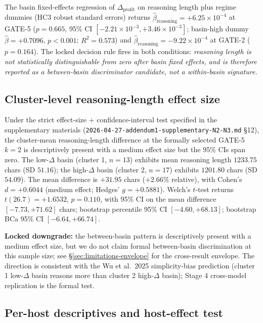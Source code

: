 The basin fixed-effects regression of $\Delta_{\text{profit}}$ on reasoning length plus regime dummies (HC3 robust standard errors) returns $\hat{\beta}_{\text{reasoning}} = +6.25 \times 10^{-4}$ at GATE-5 ($p = 0.665$, 95\% CI $[-2.21 \times 10^{-3}, +3.46 \times 10^{-3}]$; basin-high dummy $\hat{\beta} = +0.7096$, $p < 0.001$; $R^2 = 0.573$) and $\hat{\beta}_{\text{reasoning}} = -9.22 \times 10^{-4}$ at GATE-2 ($p = 0.164$). The locked decision rule fires in both conditions: \emph{reasoning length is not statistically distinguishable from zero after basin fixed effects, and is therefore reported as a between-basin discriminator candidate, not a within-basin signature.}

\subsection{Cluster-level reasoning-length effect size}
\label{sec:results-cluster-effect}

Under the strict effect-size + confidence-interval test specified in the supplementary materials (\texttt{2026-04-27-addendum1-supplementary-N2-N3.md} \S 12), the cluster-mean reasoning-length difference at the formally selected GATE-5 $k = 2$ is descriptively present with a medium effect size but the 95\% CIs span zero. The low-$\Delta$ basin (cluster 1, $n = 13$) exhibits mean reasoning length $1233.75$ chars (SD $51.16$); the high-$\Delta$ basin (cluster 2, $n = 17$) exhibits $1201.80$ chars (SD $54.09$). The mean difference is $+31.95$ chars ($+2.66\%$ relative), with Cohen's $d = +0.6044$ (medium effect; Hedges' $g = +0.5881$). Welch's $t$-test returns $t(26.7) = +1.6532$, $p = 0.110$, with 95\% CI on the mean difference $[-7.73, +71.62]$ chars; bootstrap percentile 95\% CI $[-4.60, +68.13]$; bootstrap BCa 95\% CI $[-6.64, +66.74]$.

\textbf{Locked downgrade:} the between-basin pattern is descriptively present with a medium effect size, but we do not claim formal between-basin discrimination at this sample size; see \S\ref{sec:limitations-envelope} for the cross-result envelope. The direction is consistent with the Wu et al.\ 2025 simplicity-bias prediction (cluster 1 low-$\Delta$ basin reasons more than cluster 2 high-$\Delta$ basin); Stage 4 cross-model replication is the formal test.

\subsection{Per-host descriptives and host-effect test}
\label{sec:results-host}

